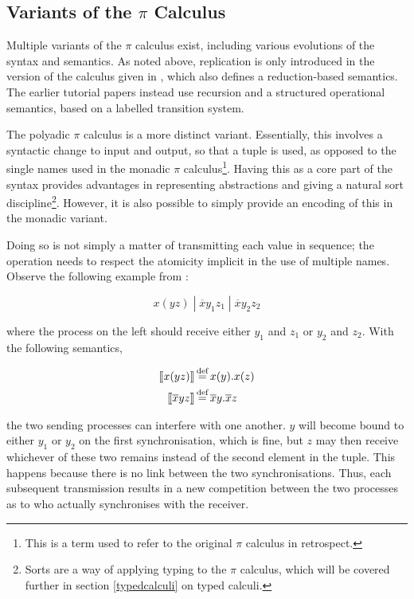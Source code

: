 \subsection{Variants of the $\pi$ Calculus}
\label{pivariants}

Multiple variants of the $\pi$ calculus exist, including various
evolutions of the syntax and semantics.  As noted above, replication
is only introduced in the version of the calculus given in
\cite{funcproc}, which also defines a reduction-based semantics.  The
earlier tutorial papers \cite{picalctutorial} instead use recursion
and a structured operational semantics, based on a labelled transition
system.

The polyadic $\pi$ calculus \cite{milner:93polyadic} is a more
distinct variant.  Essentially, this involves a syntactic change to
input and output, so that a tuple is used, as opposed to the single
names used in the monadic $\pi$ calculus\footnote{This is a term used
  to refer to the original $\pi$ calculus in retrospect.}.  Having
this as a core part of the syntax provides advantages in representing
abstractions and giving a natural sort discipline\footnote{Sorts are a
  way of applying typing to the $\pi$ calculus, which will be covered
  further in section \ref{typedcalculi} on typed calculi.}.  However,
it is also possible to simply provide an encoding of this in the
monadic variant.

Doing so is not simply a matter of transmitting each value in
sequence; the operation needs to respect the atomicity implicit in the
use of multiple names.  Observe the following example from
\cite{milner:93polyadic}:

\begin{equation}
x(yz)\;|\;\overline{x}y_1z_1\;|\;\overline{x}y_2z_2
\end{equation}

\noindent where the process on the left should receive either $y_1$ and
$z_1$ or $y_2$ and $z_2$.  With the following semantics,

\begin{align}
\seml x(yz) \semr & \eqdef x(y).x(z) \\
\seml \overline{x}yz \semr & \eqdef \overline{x}y.\overline{x}z
\end{align}

\noindent the two sending processes can interfere with one another.
$y$ will become bound to either $y_1$ or $y_2$ on the first
synchronisation, which is fine, but $z$ may then receive whichever of
these two remains instead of the second element in the tuple.  This
happens because there is no link between the two synchronisations.
Thus, each subsequent transmission results in a new competition
between the two processes as to who actually synchronises with the
receiver.

